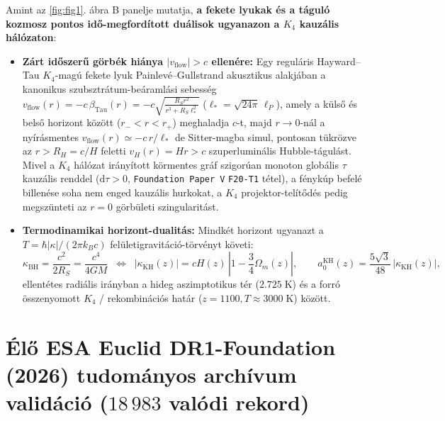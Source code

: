\documentclass[11pt,a4paper]{article}
\begin{document}
Amint az \ref{fig:fig1}. ábra B panelje mutatja, \textbf{a fekete lyukak és a táguló kozmosz pontos idő-megfordított duálisok ugyanazon a $K_4$ kauzális hálózaton}:
\begin{itemize}
  \item \textbf{Zárt időszerű görbék hiánya $|v_{\mathrm{flow}}| > c$ ellenére:} Egy reguláris Hayward--Tau $K_4$-magú fekete lyuk Painlevé--Gullstrand akusztikus alakjában a kanonikus szubsztrátum-beáramlási sebesség $v_{\mathrm{flow}}(r) = -c\,\beta_{\mathrm{Tau}}(r) = -c\sqrt{\frac{R_S r^2}{r^3 + R_S\ell_*^2}}$ ($\ell_* = \sqrt{24\pi}\,\ell_P$), amely a külső és belső horizont között ($r_- < r < r_+$) meghaladja $c$-t, majd $r \to 0$-nál a nyírásmentes $v_{\mathrm{flow}}(r) \simeq -c\,r/\ell_*$ de Sitter-magba simul, pontosan tükrözve az $r > R_H = c/H$ feletti $v_H(r) = H r > c$ szuperluminális Hubble-tágulást. Mivel a $K_4$ hálózat irányított körmentes gráf szigorúan monoton globális $\tau$ kauzális renddel ($\mathrm{d}\tau > 0$, \texttt{Foundation Paper V} \texttt{F20-T1} tétel), a fénykúp befelé billenése soha nem enged kauzális hurkokat, a $K_4$ projektor-telítődés pedig megszünteti az $r = 0$ görbületi szingularitást.
  \item \textbf{Termodinamikai horizont-dualitás:} Mindkét horizont ugyanazt a $T = \hbar |\kappa|/(2\pi k_B c)$ felületigravitáció-törvényt követi:
  \begin{equation}
    \kappa_{\mathrm{BH}} = \frac{c^2}{2 R_S} = \frac{c^4}{4 G M} \;\;\Longleftrightarrow\;\;
    |\kappa_{\mathrm{KH}}(z)| = c H(z)\,\left|1 - \frac{3}{4}\Omega_m(z)\right|, \qquad
    a_0^{\mathrm{KH}}(z) = \frac{5\sqrt{3}}{48}\,|\kappa_{\mathrm{KH}}(z)|,
  \end{equation}
  ellentétes radiális irányban a hideg aszimptotikus tér ($2.725\;\mathrm{K}$) és a forró összenyomott $K_4$ / rekombinációs határ ($z = 1100, T \approx 3000\;\mathrm{K}$) között.
\end{itemize}

\newpage
\section{Élő ESA Euclid DR1-Foundation (2026) tudományos archívum validáció (\texorpdfstring{$18\,983$}{18,983} valódi rekord)}
\end{document}
